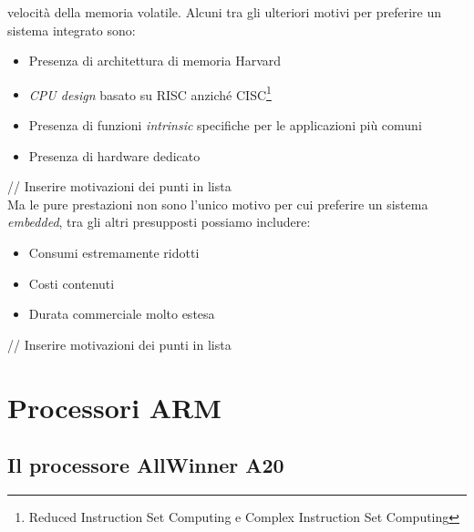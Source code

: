 velocità della memoria volatile.
Alcuni tra gli ulteriori  motivi per preferire un sistema integrato sono:
\begin{itemize}
\item Presenza di architettura di memoria Harvard
\item \emph{CPU design} basato su RISC anziché CISC\footnote{Reduced 
Instruction Set Computing e Complex Instruction Set Computing}
\item Presenza di funzioni \emph{intrinsic} specifiche per le applicazioni più 
comuni
\item Presenza di hardware dedicato
\end{itemize}
// Inserire motivazioni dei punti in lista \\
Ma le pure prestazioni non sono l'unico motivo per cui preferire un sistema 
\emph{embedded}, tra gli altri presupposti possiamo includere:
\begin{itemize}
\item Consumi estremamente ridotti
\item Costi contenuti
\item Durata commerciale molto estesa
\end{itemize}
// Inserire motivazioni dei punti in lista

\section{Processori ARM}


\subsection{Il processore AllWinner A20}

\newpage
